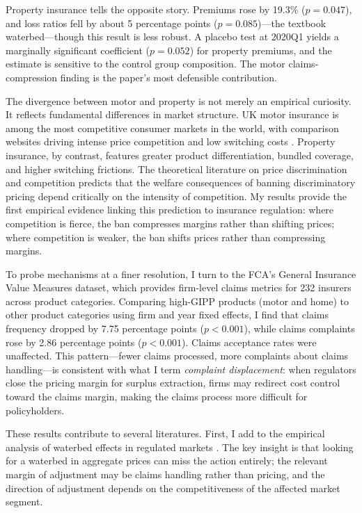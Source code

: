 \documentclass[12pt]{article}
\begin{document}
Property insurance tells the opposite story. Premiums rose by 19.3\% ($p = 0.047$), and loss ratios fell by about 5 percentage points ($p = 0.085$)---the textbook waterbed---though this result is less robust. A placebo test at 2020Q1 yields a marginally significant coefficient ($p = 0.052$) for property premiums, and the estimate is sensitive to the control group composition. The motor claims-compression finding is the paper's most defensible contribution.

The divergence between motor and property is not merely an empirical curiosity. It reflects fundamental differences in market structure. UK motor insurance is among the most competitive consumer markets in the world, with comparison websites driving intense price competition and low switching costs \citep{Honka2014, FCA_EP25_2}. Property insurance, by contrast, features greater product differentiation, bundled coverage, and higher switching frictions. The theoretical literature on price discrimination and competition \citep{Stole2007, SalopStiglitz1977} predicts that the welfare consequences of banning discriminatory pricing depend critically on the intensity of competition. My results provide the first empirical evidence linking this prediction to insurance regulation: where competition is fierce, the ban compresses margins rather than shifting prices; where competition is weaker, the ban shifts prices rather than compressing margins.

To probe mechanisms at a finer resolution, I turn to the FCA's General Insurance Value Measures dataset, which provides firm-level claims metrics for 232 insurers across product categories. Comparing high-GIPP products (motor and home) to other product categories using firm and year fixed effects, I find that claims frequency dropped by 7.75 percentage points ($p < 0.001$), while claims complaints rose by 2.86 percentage points ($p < 0.001$). Claims acceptance rates were unaffected. This pattern---fewer claims processed, more complaints about claims handling---is consistent with what I term \textit{complaint displacement}: when regulators close the pricing margin for surplus extraction, firms may redirect cost control toward the claims margin, making the claims process more difficult for policyholders.

These results contribute to several literatures. First, I add to the empirical analysis of waterbed effects in regulated markets \citep{GenakosValletti2011, Armstrong2006, Inderst2007}. The key insight is that looking for a waterbed in aggregate prices can miss the action entirely; the relevant margin of adjustment may be claims handling rather than pricing, and the direction of adjustment depends on the competitiveness of the affected market segment.
\end{document}
